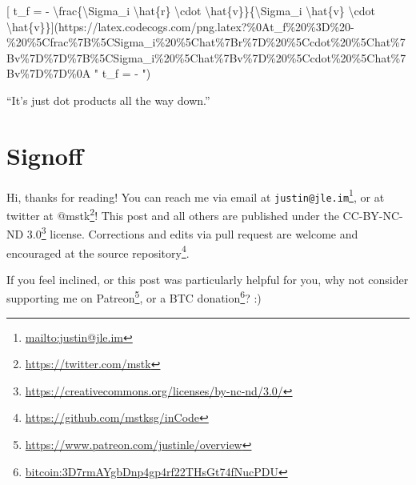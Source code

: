 \documentclass[]{article}
\renewcommand{\href}[2]{#2\footnote{\url{#1}}}
\begin{document}
{[} t\_f = - \textbackslash{}frac\{\textbackslash{}Sigma\_i
\textbackslash{}hat\{r\} \textbackslash{}cdot
\textbackslash{}hat\{v\}\}\{\textbackslash{}Sigma\_i \textbackslash{}hat\{v\}
\textbackslash{}cdot
\textbackslash{}hat\{v\}\}{]}(https://latex.codecogs.com/png.latex?\%0At\_f\%20\%3D\%20-\%20\%5Cfrac\%7B\%5CSigma\_i\%20\%5Chat\%7Br\%7D\%20\%5Ccdot\%20\%5Chat\%7Bv\%7D\%7D\%7B\%5CSigma\_i\%20\%5Chat\%7Bv\%7D\%20\%5Ccdot\%20\%5Chat\%7Bv\%7D\%7D\%0A
" t\_f = - 
")

``It's just dot products all the way down.''

\hypertarget{signoff}{%
\section{Signoff}\label{signoff}}

Hi, thanks for reading! You can reach me via email at
\href{mailto:justin@jle.im}{\nolinkurl{justin@jle.im}}, or at twitter at
\href{https://twitter.com/mstk}{@mstk}! This post and all others are published
under the \href{https://creativecommons.org/licenses/by-nc-nd/3.0/}{CC-BY-NC-ND
3.0} license. Corrections and edits via pull request are welcome and encouraged
at \href{https://github.com/mstksg/inCode}{the source repository}.

If you feel inclined, or this post was particularly helpful for you, why not
consider \href{https://www.patreon.com/justinle/overview}{supporting me on
Patreon}, or a \href{bitcoin:3D7rmAYgbDnp4gp4rf22THsGt74fNucPDU}{BTC donation}?
:)
\end{document}
